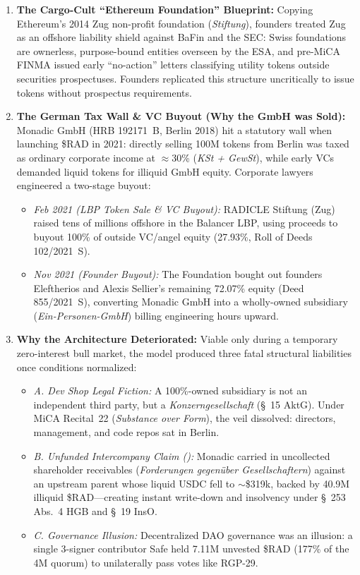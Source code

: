 \documentclass[a4paper,11pt,twoside,parskip=half-,headings=small]{scrartcl}
\begin{document}
\begin{enumerate}[nosep]
  \item \textbf{The Cargo-Cult ``Ethereum Foundation'' Blueprint:} Copying Ethereum's 2014 Zug non-profit foundation (\emph{Stiftung}), founders treated Zug as an offshore liability shield against BaFin and the SEC: Swiss foundations are ownerless, purpose-bound entities overseen by the ESA, and pre-MiCA FINMA issued early ``no-action'' letters classifying utility tokens outside securities prospectuses. Founders replicated this structure uncritically to issue tokens without prospectus requirements.
  
  \item \textbf{The German Tax Wall \& VC Buyout (Why the GmbH was Sold):} Monadic GmbH (HRB 192171~B, Berlin 2018) hit a statutory wall when launching \$RAD in 2021: directly selling 100M tokens from Berlin was taxed as ordinary corporate income at $\approx$30\% (\emph{KSt + GewSt}), while early VCs demanded liquid tokens for illiquid GmbH equity. Corporate lawyers engineered a two-stage buyout:
  \begin{itemize}[nosep]
    \item \emph{Feb 2021 (LBP Token Sale \& VC Buyout):} RADICLE Stiftung (Zug) raised tens of millions offshore in the Balancer LBP, using proceeds to buyout 100\% of outside VC/angel equity (27.93\%, Roll of Deeds 102/2021~S).
    \item \emph{Nov 2021 (Founder Buyout):} The Foundation bought out founders Eleftherios and Alexis Sellier's remaining 72.07\% equity (Deed 855/2021~S), converting Monadic GmbH into a wholly-owned subsidiary (\emph{Ein-Personen-GmbH}) billing engineering hours upward.
  \end{itemize}

  \item \textbf{Why the Architecture Deteriorated:} Viable only during a temporary zero-interest bull market, the model produced three fatal structural liabilities once conditions normalized:
  \begin{itemize}[nosep]
    \item \emph{A. Dev Shop Legal Fiction:} A 100\%-owned subsidiary is not an independent third party, but a \emph{Konzerngesellschaft} (\S~15 AktG). Under MiCA Recital~22 (\emph{Substance over Form}), the veil dissolved: directors, management, and code repos sat in Berlin.
    \item \emph{B. Unfunded Intercompany Claim ():} Monadic carried  in uncollected shareholder receivables (\emph{Forderungen gegen{\"u}ber Gesellschaftern}) against an upstream parent whose liquid USDC fell to $\sim$\$319k, backed by 40.9M illiquid \$RAD---creating instant write-down and insolvency under \S~253 Abs.~4 HGB and \S~19 InsO.
    \item \emph{C. Governance Illusion:} Decentralized DAO governance was an illusion: a single 3-signer contributor Safe held 7.11M unvested \$RAD (177\% of the 4M quorum) to unilaterally pass votes like RGP-29.
  \end{itemize}
\end{enumerate}
\end{document}
